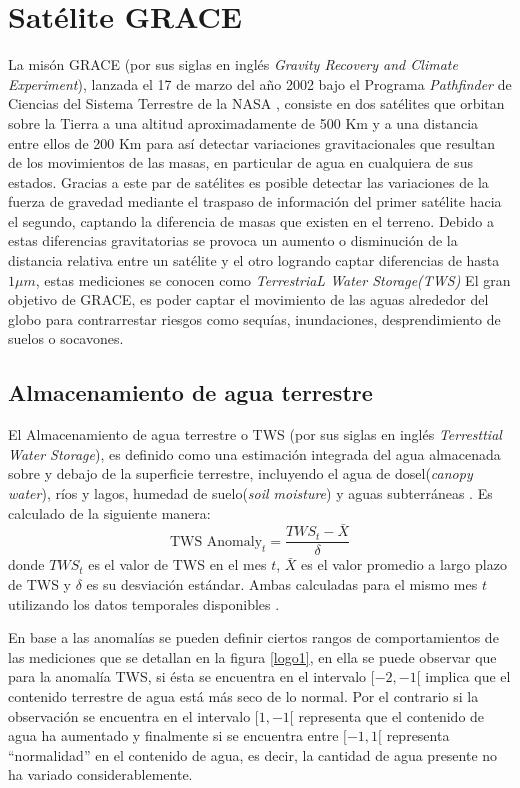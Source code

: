 \section{Satélite GRACE}
La misón GRACE (por sus siglas en inglés \textit{Gravity Recovery and Climate Experiment}), lanzada el 17 de marzo del año 2002
bajo el Programa \textit{Pathfinder} de Ciencias del Sistema Terrestre de la NASA \cite{11}, consiste en dos satélites 
que orbitan sobre la Tierra a una altitud aproximadamente de 500 Km y a una distancia entre ellos de 200 Km \cite{tws} para así detectar variaciones gravitacionales que resultan
de los movimientos de las masas, en particular de agua en cualquiera de sus estados.
Gracias a este par de satélites es posible detectar las variaciones de la fuerza de gravedad 
mediante el traspaso de información del primer satélite hacia el segundo, captando la diferencia de 
masas que existen en el terreno. Debido a estas diferencias gravitatorias se provoca un aumento o 
disminución de la distancia relativa entre un satélite y el otro logrando captar diferencias de hasta 
$1\mu m$, estas mediciones se conocen como \textit{TerrestriaL Water Storage(TWS)}
El gran objetivo de GRACE, es poder captar el movimiento de las aguas alrededor del globo para 
contrarrestar riesgos como sequías, inundaciones, desprendimiento de suelos o socavones.

\subsection{Almacenamiento de agua terrestre}
El Almacenamiento de agua terrestre o TWS (por sus siglas en inglés \textit{Terresttial Water Storage}), es definido como una estimación integrada del agua almacenada sobre y debajo de la superficie terrestre, 
incluyendo el agua de dosel(\textit{canopy water}), ríos y lagos, humedad de suelo(\textit{soil moisture}) y aguas subterráneas \cite{tws}. Es calculado de la siguiente manera:
\begin{equation}
    \text{TWS Anomaly}_t = \frac{TWS_t-\bar{X}}{\delta}
\end{equation}
donde $TWS_t$ es el valor de TWS en el mes $t$, $\bar{X}$ es el valor promedio a largo plazo de TWS y $\delta$ es su desviación estándar. Ambas calculadas para el mismo mes $t$ utilizando 
los datos temporales disponibles \cite{tws}.

En base a las anomalías se pueden definir ciertos rangos de comportamientos de las mediciones que se detallan en la figura \ref{logo1}, en ella se puede observar que para la anomalía TWS, si ésta se encuentra en el intervalo $[-2,-1[$
implica que  el contenido terrestre de agua está más seco de lo normal. Por el contrario si la observación se encuentra en el intervalo $[1,-1[$ representa que el contenido de agua ha aumentado y finalmente si se encuentra entre
$[-1,1[$ representa ``normalidad'' en el contenido de agua, es decir, la cantidad de agua presente no ha variado considerablemente.

